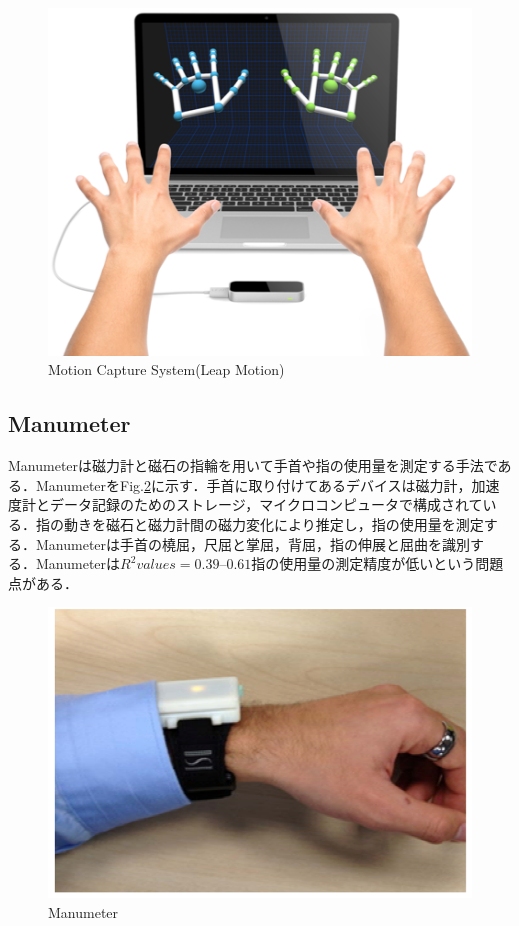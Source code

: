 \begin{figure}[H]
  \centering
  \includegraphics[width=0.6\linewidth]{fig/ch1/mcs}
  \caption{Motion Capture System(Leap Motion)}
  \label{fig:Motion Capture System}
\end{figure}

\subsection*{Manumeter}
Manumeter\cite{Friedman2014}は磁力計と磁石の指輪を用いて手首や指の使用量を測定する手法である．ManumeterをFig.\ref{fig:Manumeter}に示す．手首に取り付けてあるデバイスは磁力計，加速度計とデータ記録のためのストレージ，マイクロコンピュータで構成されている．指の動きを磁石と磁力計間の磁力変化により推定し，指の使用量を測定する．Manumeterは手首の橈屈，尺屈と掌屈，背屈，指の伸展と屈曲を識別する．Manumeterは$R^2 values=0.39–0.61$指の使用量の測定精度が低いという問題点がある．
\begin{figure}[H]
  \centering
  \includegraphics[width=0.6\linewidth]{fig/ch1/manumeter}
  \caption{Manumeter\cite{Friedman2014}}
  \label{fig:Manumeter}
\end{figure}

